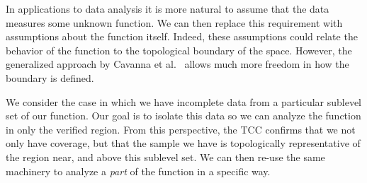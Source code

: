 In applications to data analysis it is more natural to assume that the data measures some unknown function.
We can then replace this requirement with assumptions about the function itself.
Indeed, these assumptions could relate the behavior of the function to the topological boundary of the space.
However, the generalized approach by Cavanna et al.~\cite{cavanna2017when} allows much more freedom in how the boundary is defined.

We consider the case in which we have incomplete data from a particular sublevel set of our function.
Our goal is to isolate this data so we can analyze the function in only the verified region.
From this perspective, the TCC confirms that we not only have coverage, but that the sample we have is topologically representative of the region near, and above this sublevel set.
We can then re-use the same machinery to analyze a \emph{part} of the function in a specific way.
